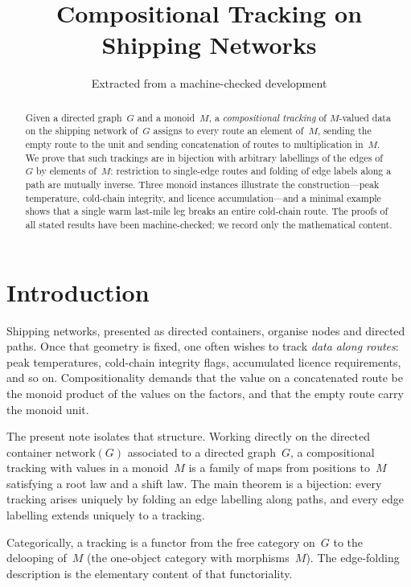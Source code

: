 \documentclass[11pt,a4paper]{article}
\title{Compositional Tracking on Shipping Networks}
\author{Extracted from a machine-checked development}
\date{}
\theoremstyle{plain}
\theoremstyle{definition}
\begin{document}
\maketitle

\begin{abstract}
Given a directed graph~$G$ and a monoid~$M$, a \emph{compositional tracking}
of $M$-valued data on the shipping network of~$G$ assigns to every route an
element of~$M$, sending the empty route to the unit and sending concatenation
of routes to multiplication in~$M$. We prove that such trackings are in
bijection with arbitrary labellings of the edges of~$G$ by elements of~$M$:
restriction to single-edge routes and folding of edge labels along a path are
mutually inverse. Three monoid instances illustrate the construction---peak
temperature, cold-chain integrity, and licence accumulation---and a minimal
example shows that a single warm last-mile leg breaks an entire cold-chain
route. The proofs of all stated results have been machine-checked; we record
only the mathematical content.
\end{abstract}

\tableofcontents
\bigskip

\section{Introduction}

Shipping networks, presented as directed containers, organise nodes and
directed paths. Once that geometry is fixed, one often wishes to track
\emph{data along routes}: peak temperatures, cold-chain integrity flags,
accumulated licence requirements, and so on. Compositionality demands that the
value on a concatenated route be the monoid product of the values on the
factors, and that the empty route carry the monoid unit.

The present note isolates that structure. Working directly on the directed
container $\mathrm{network}(G)$ associated to a directed graph~$G$, a
compositional tracking with values in a monoid~$M$ is a family of maps from
positions to~$M$ satisfying a root law and a shift law. The main theorem is a
bijection: every tracking arises uniquely by folding an edge labelling along
paths, and every edge labelling extends uniquely to a tracking.

Categorically, a tracking is a functor from the free category on~$G$ to the
delooping of~$M$ (the one-object category with morphisms~$M$). The edge-folding
description is the elementary content of that functoriality.
\end{document}
